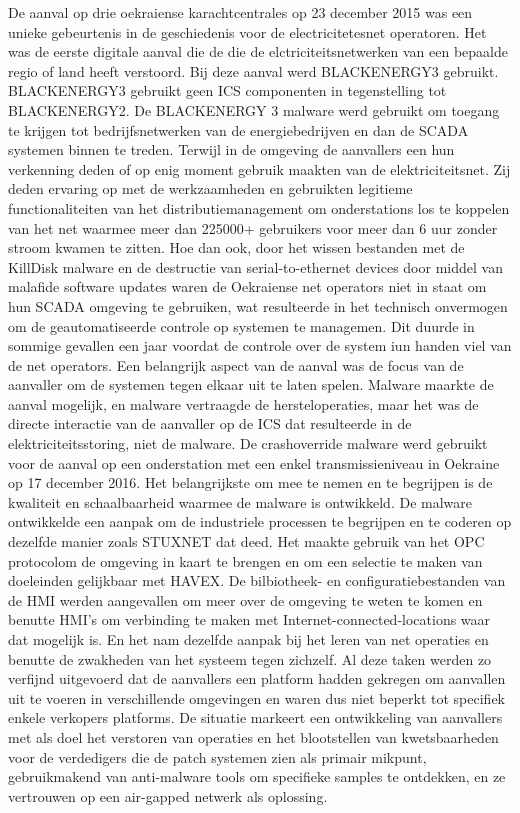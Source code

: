		De aanval op drie oekraiense karachtcentrales op 23 december 2015 was een unieke gebeurtenis in
		de geschiedenis voor de electricitetesnet operatoren. Het was de eerste digitale aanval die de die de
		elctriciteitsnetwerken van een bepaalde regio of land heeft verstoord. Bij deze aanval werd
		BLACKENERGY3 gebruikt. BLACKENERGY3 gebruikt geen ICS componenten in tegenstelling tot
		BLACKENERGY2. De BLACKENERGY 3 malware werd gebruikt om toegang te krijgen tot
		bedrijfsnetwerken van de energiebedrijven en dan de SCADA systemen binnen te treden. Terwijl in
		de omgeving de aanvallers een hun verkenning deden of op enig moment gebruik maakten van de
		elektriciteitsnet. Zij deden ervaring op met de werkzaamheden en gebruikten legitieme
		functionaliteiten van het distributiemanagement om onderstations los te koppelen van het net
		waarmee meer dan 225000+ gebruikers voor meer dan 6 uur zonder stroom kwamen te zitten. Hoe
		dan ook, door het wissen bestanden met de KillDisk malware en de destructie van serial-to-ethernet
		devices door middel van malafide software updates waren de Oekraiense net operators niet in staat
		om hun SCADA omgeving te gebruiken, wat resulteerde in het technisch onvermogen om de
		geautomatiseerde controle op systemen te managemen. Dit duurde in sommige gevallen een jaar
		voordat de controle over de system iun handen viel van de net operators. Een belangrijk aspect van
		de aanval was de focus van de aanvaller om de systemen tegen elkaar uit te laten spelen. Malware
		maarkte de aanval mogelijk, en malware vertraagde de hersteloperaties, maar het was de directe
		interactie van de aanvaller op de ICS dat resulteerde in de elektriciteitsstoring, niet de malware.
		De crashoverride malware werd gebruikt voor de aanval op een onderstation met een enkel
		transmissieniveau in Oekraine op 17 december 2016. Het belangrijkste om mee te nemen en te
		begrijpen is de kwaliteit en schaalbaarheid waarmee de malware is ontwikkeld. De malware
		ontwikkelde een aanpak om de industriele processen te begrijpen en te coderen op dezelfde manier
		zoals STUXNET dat deed. Het maakte gebruik van het OPC protocolom de omgeving in kaart te
		brengen en om een selectie te maken van doeleinden gelijkbaar met HAVEX. De bilbiotheek- en
		configuratiebestanden van de HMI werden aangevallen om meer over de omgeving te weten te
		komen en benutte HMI’s om verbinding te maken met Internet-connected-locations waar dat
		mogelijk is. En het nam dezelfde aanpak bij het leren van net operaties en benutte de zwakheden van
		het systeem tegen zichzelf. Al deze taken werden zo verfijnd uitgevoerd dat de aanvallers een
		platform hadden gekregen om aanvallen uit te voeren in verschillende omgevingen en waren dus
		niet beperkt tot specifiek enkele verkopers platforms. De situatie markeert een ontwikkeling van
		aanvallers met als doel het verstoren van operaties en het blootstellen van kwetsbaarheden voor de
		verdedigers die de patch systemen zien als primair mikpunt, gebruikmakend van anti-malware tools
		om specifieke samples te ontdekken, en ze vertrouwen op een air-gapped netwerk als oplossing.
		

